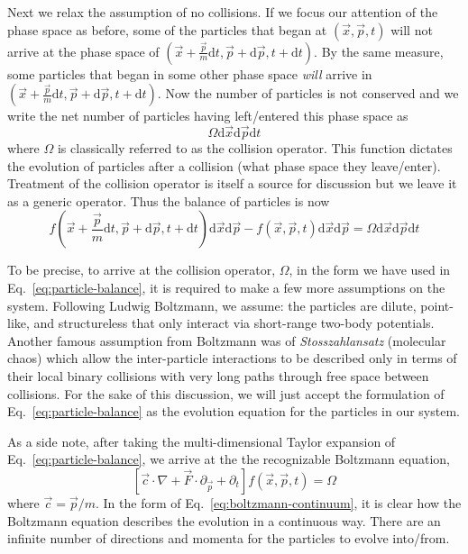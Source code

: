 Next we relax the assumption of no collisions. If we focus our attention of the phase space as before, some of the particles that began at $(\vec{x},\vec{p},t)$ will not arrive at the phase space of $(\vec{x} + \frac{\vec{p}}{m}\mathrm{d}t,\vec{p} + \mathrm{d}\vec{p},t + \mathrm{d}t)$. By the same measure, some particles that began in some other phase space \textit{will} arrive in $(\vec{x} + \frac{\vec{p}}{m}\mathrm{d}t,\vec{p} + \mathrm{d}\vec{p},t + \mathrm{d}t)$. Now the number of particles is not conserved and we write the net number of particles having left/entered this phase space as
\begin{equation}
	\Omega\mathrm{d}\vec{x}\mathrm{d}\vec{p}\mathrm{d}t
\end{equation}
where $\Omega$ is classically referred to as the collision operator. This function dictates the evolution of particles after a collision (what phase space they leave/enter). Treatment of the collision operator is itself a source for discussion but we leave it as a generic operator. Thus the balance of particles is now
\begin{equation}\label{eq:particle-balance}
	f(\vec{x} + \frac{\vec{p}}{m}\mathrm{d}t,\vec{p} + \mathrm{d}\vec{p},t + \mathrm{d}t)\mathrm{d}\vec{x}\mathrm{d}\vec{p} - f(\vec{x},\vec{p},t)\mathrm{d}\vec{x}\mathrm{d}\vec{p} = \Omega\mathrm{d}\vec{x}\mathrm{d}\vec{p}\mathrm{d}t
\end{equation}

To be precise, to arrive at the collision operator, $\Omega$, in the form we have used in Eq.~\ref{eq:particle-balance}, it is required to make a few more assumptions on the system. Following Ludwig Boltzmann, we assume: the particles are dilute, point-like, and structureless that only interact via short-range two-body potentials. Another famous assumption from Boltzmann was of \textit{Stosszahlansatz} (molecular chaos) which allow the inter-particle interactions to be described only in terms of their local binary collisions with very long paths through free space between collisions.\cite{succi2001lattice} For the sake of this discussion, we will just accept the formulation of Eq.~\ref{eq:particle-balance} as the evolution equation for the particles in our system. 

As a side note, after taking the multi-dimensional Taylor expansion of Eq.~\ref{eq:particle-balance}, we arrive at the the recognizable Boltzmann equation,
\begin{equation}\label{eq:boltzmann-continuum}
	\left[\vec{c}\cdot\nabla + \vec{F}\cdot\partial_\vec{p}  + \partial_t\right] f(\vec{x},\vec{p},t) = \Omega
\end{equation}
where $\vec{c} = \vec{p}/m$. In the form of Eq.~\ref{eq:boltzmann-continuum}, it is clear how the Boltzmann equation describes the evolution in a continuous way. There are an infinite number of directions and momenta for the particles to evolve into/from. 

